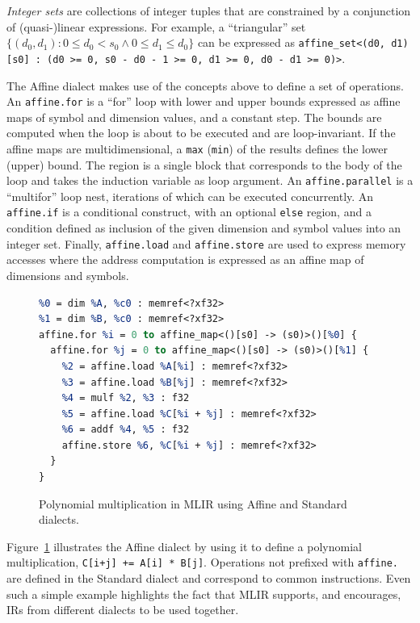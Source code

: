 \documentclass[sigplan]{acmart}
\newcommand{\icode}[1]{{\texttt {#1}}}
\begin{document}
\emph{Integer sets} are collections of integer tuples that are constrained by a conjunction of (quasi-)linear expressions.
For example, a ``triangular'' set $\{(d_0, d_1) : 0 \leq d_0 < s_0 \land 0 \leq d_1 \leq d_0\}$ can be expressed as
\icode{affine\_set<(d0, d1)[s0] : (d0 >= 0, s0 - d0 - 1 >= 0, d1 >= 0, d0 - d1 >= 0)>}.

The Affine dialect makes use of the concepts above to define a set of operations.
An \icode{affine.for} is a ``for'' loop with lower and upper bounds expressed as affine maps of symbol and dimension values, and a constant step.
The bounds are computed when the loop is about to be executed and are loop-invariant.
If the affine maps are multidimensional, a \icode{max} (\icode{min}) of the results defines the lower (upper) bound.
The region is a single block that corresponds to the body of the loop and takes the induction variable as loop argument.
An \icode{affine.parallel} is a ``multifor'' loop nest, iterations of which can be executed concurrently.
An \icode{affine.if} is a conditional construct, with an optional \icode{else} region, and a condition defined as inclusion of the given dimension and symbol values into an integer set.
Finally, \icode{affine.load} and \icode{affine.store} are used to express memory accesses where the address computation is expressed as an affine map of dimensions and symbols.

\begin{figure}
{
\scriptsize
\begin{lstlisting}[language=llvm, escapeinside=@@, mathescape=true]
%c0 = constant 0 : index
%0 = dim %A, %c0 : memref<?xf32>
%1 = dim %B, %c0 : memref<?xf32>
affine.for %i = 0 to affine_map<()[s0] -> (s0)>()[%0] {
  affine.for %j = 0 to affine_map<()[s0] -> (s0)>()[%1] {
    %2 = affine.load %A[%i] : memref<?xf32>
    %3 = affine.load %B[%j] : memref<?xf32>
    %4 = mulf %2, %3 : f32
    %5 = affine.load %C[%i + %j] : memref<?xf32>
    %6 = addf %4, %5 : f32
    affine.store %6, %C[%i + %j] : memref<?xf32>
  }
}
\end{lstlisting}
}
\vspace{-.5cm}
\caption{Polynomial multiplication in MLIR using Affine and Standard dialects.}
\label{fig:polynomial}
\end{figure}

Figure~\ref{fig:polynomial} illustrates the Affine dialect by using it to define a polynomial multiplication, \icode{C[i+j] += A[i] * B[j]}.
Operations not prefixed with \icode{affine.} are defined in the Standard dialect and correspond to common instructions.
Even such a simple example highlights the fact that MLIR supports, and encourages, IRs from different dialects to be used together.
\end{document}
